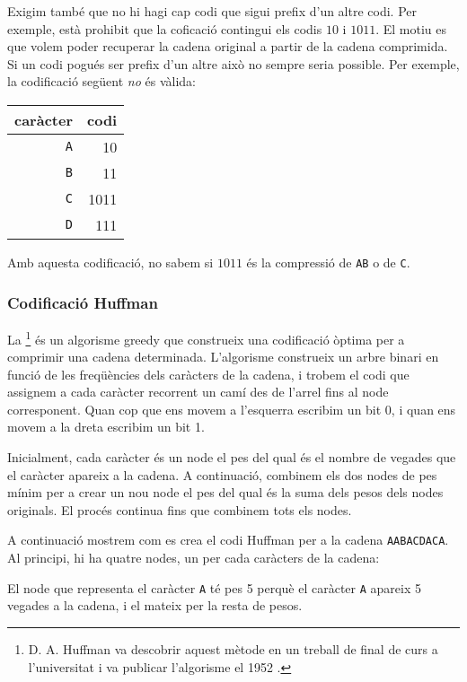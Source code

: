 Exigim també que no hi hagi cap codi que sigui
prefix d'un altre codi.
Per exemple, està prohibit que la coficació
contingui els codis $10$ i $1011$.
El motiu es que volem
poder recuperar la cadena original
a partir de la cadena comprimida.
Si un codi pogués ser prefix d'un altre
això no sempre seria possible.
Per exemple, la codificació següent \emph{no} és vàlida:
\begin{center}
\begin{tabular}{rr}
caràcter & codi \\
\hline
\texttt{A} & 10 \\
\texttt{B} & 11 \\
\texttt{C} & 1011 \\
\texttt{D} & 111 \\
\end{tabular}
\end{center}
Amb aquesta codificació, no sabem si $1011$ és la compressió
de \texttt{AB} o de \texttt{C}.


\subsubsection{Codificació Huffman}

La \footnote{D. A. Huffman va descobrir
aquest mètode en un treball de final de curs a l'universitat
i va publicar l'algorisme el 1952 \cite{huf52}.} és un algorisme
greedy que construeix una codificació òptima per
a comprimir una cadena determinada.
L'algorisme construeix un arbre binari
en funció de les freqüències dels caràcters
de la cadena,
i trobem el codi que assignem a cada caràcter
recorrent un camí des de l'arrel fins al node
corresponent.
Quan cop que ens movem a l'esquerra escribim un bit 0,
i quan ens movem a la dreta escribim un bit 1.

Inicialment, cada caràcter és un node el pes del qual és el
nombre de vegades que el caràcter apareix a la cadena.
A continuació, combinem els dos nodes de pes mínim
per a crear un nou node el pes del qual és la suma dels
pesos dels nodes originals.
El procés continua fins que combinem tots els nodes.

A continuació mostrem com es crea el codi Huffman
per a la cadena \texttt{AABACDACA}.
Al principi, hi ha quatre nodes, un per cada caràcters
de la cadena:

\begin{center}
\end{center}
El node que representa el caràcter \texttt{A}
té pes 5 perquè el caràcter \texttt{A}
apareix 5 vegades a la cadena, i el mateix per la
resta de pesos.


